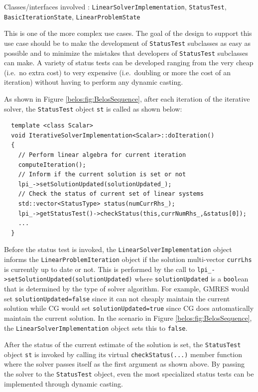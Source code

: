 \documentclass[pdf,ps2pdf,11pt]{SANDreport}
\begin{document}
\begin{enumerate}
{}\noindent{}Classes/interfaces involved :
{}\texttt{Linear\-Solver\-Implementation}, {}\texttt{Status\-Test},
{}\texttt{Basic\-Iteration\-State}, {}\texttt{Linear\-Problem\-State}

This is one of the more complex use cases.  The goal of the design to
support this use case should be to make the development of
{}\texttt{Status\-Test} subclasses as easy as possible and to minimize
the mistakes that developers of {}\texttt{Status\-Test} subclasses can
make.  A variety of status tests can be developed ranging from the
very cheap (i.e.~no extra cost) to very expensive (i.e.~doubling or
more the cost of an iteration) without having to perform any dynamic
casting.

As shown in Figure {}\ref{belos:fig:BelosSequence}, after each
iteration of the iterative solver, the {}\texttt{Status\-Test} object
{}\texttt{st} is called as shown below:

{\scriptsize\begin{verbatim}
  template <class Scalar>
  void IterativeSolverImplementation<Scalar>::doIteration()
  {
    // Perform linear algebra for current iteration
    computeIteration();
    // Inform if the current solution is set or not
    lpi_->setSolutionUpdated(solutionUpdated_);
    // Check the status of current set of linear systems
    std::vector<StatusType> status(numCurrRhs_);
    lpi_->getStatusTest()->checkStatus(this,currNumRhs_,&status[0]);
    ...
  }
\end{verbatim}}

Before the status test is invoked, the
{}\texttt{Linear\-Solver\-Implementation} object informs the
{}\texttt{Linear\-Problem\-Iteration} object if the solution
multi-vector {}\texttt{currLhs} is currently up to date or not.  This
is performed by the call to
{}\texttt{lpi\_->\-set\-Solution\-Updated(\-solution\-Updated\-)} where
{}\texttt{solution\-Updated} is a {}\texttt{bool}ean that is
determined by the type of solver algorithm.  For example, GMRES would
set {}\texttt{solution\-Updated=false} since it can not cheaply
maintain the current solution while CG would set
{}\texttt{solution\-Updated=true} since CG does automatically maintain
the current solution.  In the scenario in Figure
{}\ref{belos:fig:BelosSequence}, the
{}\texttt{Linear\-Solver\-Implementation} object sets this to
{}\texttt{false}.

After the status of the current estimate of the solution is set, the
{}\texttt{Status\-Test} object {}\texttt{st} is invoked by calling its
virtual {}\texttt{checkStatus(...)} member function where the solver
passes itself as the first argument as shown above. By passing the
solver to the {}\texttt{Status\-Test} object, even the most
specialized status tests can be implemented through dynamic casting.


\end{enumerate}
\end{document}
